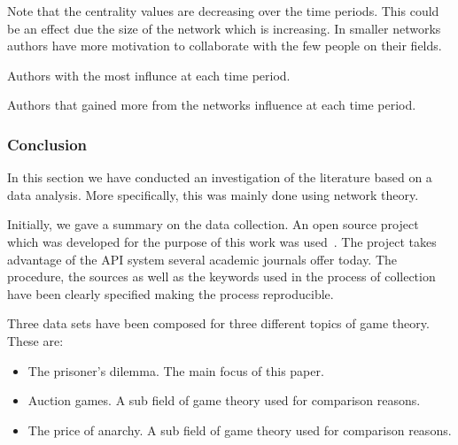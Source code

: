 \documentclass{article}
\theoremstyle{definition}
\begin{document}
Note that the centrality values are decreasing over the time periods. This could
be an effect due the size of the network which is increasing. In smaller networks
authors have more motivation to collaborate with the few people on their fields.

\begin{table}[!hbtp]
    \begin{center}
    \scalebox{0.8}{
    }
    \caption{Authors with the most influnce at each time period.}
    \label{table:cc_over_time}
    \end{center}
\end{table}

\begin{table}[!hbtp]
    \begin{center}
    \scalebox{0.8}{
    }
    \caption{Authors that gained more from the networks influence at each
    time period.}
    \label{table:bc_over_time}
    \end{center}
\end{table}

\subsubsection{Conclusion}

In this section we have conducted an investigation of the literature based on a
data analysis. More specifically, this was mainly done using network theory.

Initially, we gave a summary on the data collection. An open source project which was
developed for the purpose of this work was used~\cite{nikoleta_2017}. The project
takes advantage of the API system several academic journals offer today. The
procedure, the sources as well as the keywords used in the process of collection
have been clearly specified making the process reproducible.

Three data sets have been composed for three different topics of game theory.
These are:

\begin{itemize}
    \item The prisoner's dilemma. The main focus of this paper.
    \item Auction games. A sub field of game theory used for comparison reasons.
    \item The price of anarchy. A sub field of game theory used for comparison reasons.
\end{itemize}
\end{document}
